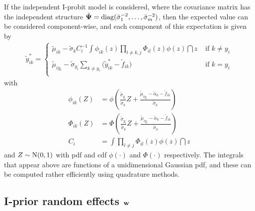 If the independent I-probit model is considered, where the covariance matrix has the independent structure $\tilde{{\bm\Psi}} = \operatorname{diag}(\tilde\sigma_1^{-2},\dots,\tilde\sigma_m^{-2})$, then the expected value can be considered component-wise, and each component of this expectation is given by
\begin{align}\label{eq:ystarupdate}
  \tilde y_{ik}^* =
  \begin{cases}
    \tilde\mu_{ik} - \tilde\sigma_k C_i^{-1} \displaystyle{  \int \phi_{ik}(z) \prod_{l \neq k,j} \Phi_{il}(z) \phi(z) \dint z }
    &\text{ if } k \neq y_i \\[1.5em]
    \tilde\mu_{iy_i} - \tilde\sigma_{y_i} \sum_{k \neq y_i} \big(\tilde y_{ik}^* - \tilde f_{ik} \big) 
    &\text{ if } k = y_i \\
  \end{cases}
\end{align}
with 
\begin{align*}
  \phi_{ik}(Z) &= \phi \left(\frac{\tilde\sigma_{y_i}}{\tilde\sigma_k} Z + \frac{\tilde\mu_{iy_i} - \tilde\alpha_k - \tilde f_{ik}}{\tilde\sigma_k} \right) \\
  \Phi_{ik}(Z) &= \Phi \left(\frac{\tilde\sigma_{y_i}}{\tilde\sigma_k} Z + \frac{\tilde\mu_{iy_i} - \tilde\alpha_k - \tilde f_{ik}}{\tilde\sigma_k} \right) \\
  C_i &= \int \prod_{l \neq j} \Phi_{il}(z) \phi(z) \dint z
\end{align*}
and $Z \sim \operatorname{N}(0,1)$ with pdf and cdf $\phi(\cdot)$ and $\Phi(\cdot)$ respectively. 
The integrals that appear above are functions of a unidimensional Gaussian pdf, and these can be computed rather efficiently using quadrature methods.

\subsection{I-prior random effects \texorpdfstring{${\mathbf w}$}{$w$}}

